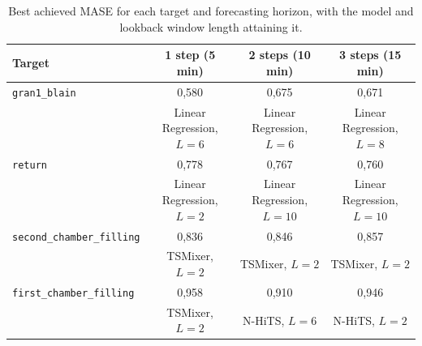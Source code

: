 \begin{table}[htbp]
\centering
\caption{Best achieved MASE for each target and forecasting horizon,
         with the model and lookback window length attaining it.}
\label{tab:mase-best-per-target}
\begin{tabular}{|l|c|c|c|}
\hline
Target & 1 step (5 min) & 2 steps (10 min) & 3 steps (15 min) \\
\hline
\texttt{gran1\_blain} & 0,580 & 0,675 & 0,671 \\
 & Linear Regression, $L=6$ & Linear Regression, $L=6$ & Linear Regression, $L=8$ \\
\hline
\texttt{return} & 0,778 & 0,767 & 0,760 \\
 & Linear Regression, $L=2$ & Linear Regression, $L=10$ & Linear Regression, $L=10$ \\
\hline
\texttt{second\_chamber\_filling} & 0,836 & 0,846 & 0,857 \\
 & TSMixer, $L=2$ & TSMixer, $L=2$ & TSMixer, $L=2$ \\
\hline
\texttt{first\_chamber\_filling} & 0,958 & 0,910 & 0,946 \\
 & TSMixer, $L=2$ & N-HiTS, $L=6$ & N-HiTS, $L=2$ \\
\hline
\end{tabular}
\end{table}
